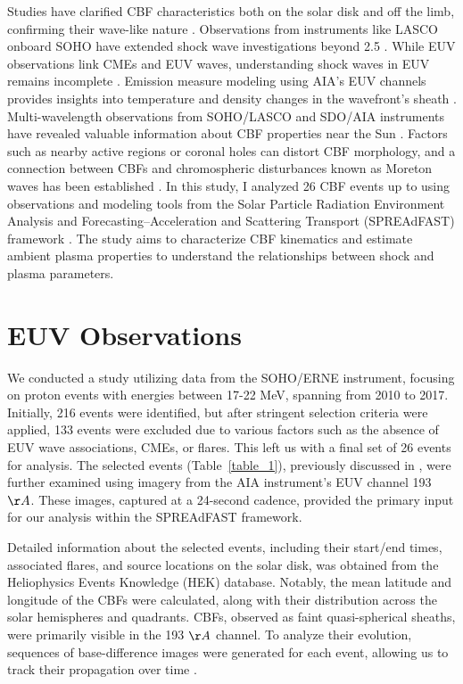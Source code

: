 Studies have clarified CBF characteristics both on the solar disk and off the limb, confirming their wave-like nature \citep{nitta_2013, long_2011, olmedo_2012}. Observations from instruments like LASCO onboard SOHO have extended shock wave investigations beyond 2.5 \rsun \citep{domingo_1995, vourlidas_2003}. While EUV observations link CMEs and EUV waves, understanding shock waves in EUV remains incomplete \citep{patsourakos_2009, kozarev_2011}. Emission measure modeling using AIA's EUV channels provides insights into temperature and density changes in the wavefront's sheath \citep{kozarev_2011}. Multi-wavelength observations from SOHO/LASCO and SDO/AIA instruments have revealed valuable information about CBF properties near the Sun \citep{warmuth_2015}.
Factors such as nearby active regions or coronal holes can distort CBF morphology, and a connection between CBFs and chromospheric disturbances known as Moreton waves has been established \citep{ofman_2002, mann_2003, piantschitsch_2018, thompson_1999b}.
In this study, I analyzed 26 CBF events up to \rsun using observations and modeling tools from the Solar Particle Radiation Environment Analysis and Forecasting--Acceleration and Scattering Transport (SPREAdFAST) framework \citep{kozarev_2022}. The study aims to characterize CBF kinematics and estimate ambient plasma properties to understand the relationships between shock and plasma parameters.

\section{EUV Observations}
We conducted a study utilizing data from the SOHO/ERNE instrument, focusing on proton events with energies between 17-22 MeV, spanning from 2010 to 2017. Initially, 216 events were identified, but after stringent selection criteria were applied, 133 events were excluded due to various factors such as the absence of EUV wave associations, CMEs, or flares. This left us with a final set of 26 events for analysis.
The selected events (Table~\ref{table_1}), previously discussed in \citep{kozarev_2022}, were further examined using imagery from the AIA instrument's EUV channel 193 $\AA$. These images, captured at a 24-second cadence, provided the primary input for our analysis within the SPREAdFAST framework.

Detailed information about the selected events, including their start/end times, associated flares, and source locations on the solar disk, was obtained from the Heliophysics Events Knowledge (HEK) database. Notably, the mean latitude and longitude of the CBFs were calculated, along with their distribution across the solar hemispheres and quadrants.
CBFs, observed as faint quasi-spherical sheaths, were primarily visible in the 193 $\AA$ channel. To analyze their evolution, sequences of base-difference images were generated for each event, allowing us to track their propagation over time \citep{vourlidas_2003, ontiveros_2009, kozarev_2011, ma_2011}.

